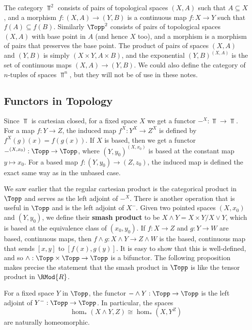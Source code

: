 The category $\Top^2$ consists of pairs of topological spaces $(X,A)$ such that $A \subseteq X$, and a morphism $f : (X,A) \rightarrow (Y,B)$ is a continuous map $f : X \rightarrow Y$ such that $f(A) \subseteq f(B)$. Similarly $\Topp^2$ consists of pairs of topological spaces $(X,A)$ with base point in $A$ (and hence $X$ too), and a morphism is a morphism of pairs that preserves the base point. The product of pairs of spaces $(X,A)$ and $(Y,B)$ is simply $(X \times Y,A \times B)$, and the exponential $(Y,B)^{(X,A)}$ is the set of continuous maps $(X,A) \rightarrow (Y,B)$. We could also define the category of $n$-tuples of spaces $\Top^n$, but they will not be of use in these notes.




\subsection{Functors in Topology}

Since $\Top$ is cartesian closed, for a fixed space $X$ we get a functor $-^X : \Top \rightarrow \Top$. For a map $f : Y \rightarrow Z$, the induced map $f^X : Y^X \rightarrow Z^X$ is defined by $f^X(g)(x) = f(g(x))$. If $X$ is based, then we get a functor $-^{(X,x_0)} : \Topp \rightarrow \Topp$, where $(Y,y_0)^{(X,x_0)}$ is based at the constant map $y \mapsto x_0$. For a based map $f : (Y,y_0) \rightarrow (Z,z_0)$, the induced map is defined the exact same way as in the unbased case.

We saw earlier that the regular cartesian product is the categorical product in $\Topp$ and serves as the left adjoint of $-^X$. There is another operation that is useful in $\Topp$ and is the left adjoint of $X^-$. Given two pointed spaces $(X,x_0)$ and $(Y,y_0)$, we define their \textbf{smash product} to be $X \wedge Y = X \times Y / X \vee Y$, which is based at the equivalence class of $(x_0,y_0)$. If $f : X \rightarrow Z$ and $g : Y \rightarrow W$ are based, continuous maps, then $f \wedge g : X \wedge Y \rightarrow Z \wedge W$ is the based, continuous map that sends $[x,y]$ to $[f(x),g(y)]$. It is easy to show that this is well-defined, and so $\wedge : \Topp \times \Topp \rightarrow \Topp$ is a bifunctor. The following proposition makes precise the statement that the smash product in $\Topp$ is like the tensor product in $\RMod{R}$.
\begin{prop}
\label{wedge and exponential adjoint}
For a fixed space $Y$ in $\Topp$, the functor $- \wedge Y : \Topp \rightarrow \Topp$ is the left adjoint of $Y^- : \Topp \rightarrow \Topp$. In particular, the spaces
\[ \hom_*(X \wedge Y,Z) \cong \hom_*(X,Y^Z) \]
are naturally homeomorphic.
\end{prop}

